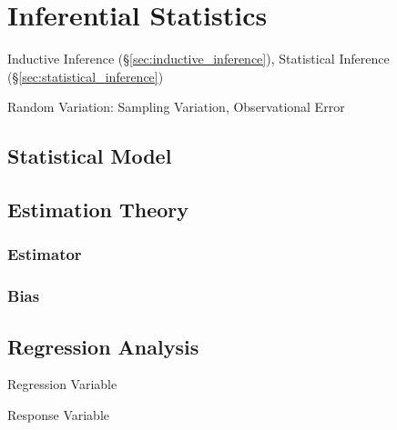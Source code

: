 \section{Inferential Statistics}\label{sec:inferential_statistics}

Inductive Inference (\S\ref{sec:inductive_inference}), Statistical
Inference (\S\ref{sec:statistical_inference})

Random Variation: Sampling Variation, Observational Error



\subsection{Statistical Model}\label{sec:statistical_model}

\subsection{Estimation Theory}\label{sec:estimation_theory}

\subsubsection{Estimator}\label{sec:estimator}

\subsubsection{Bias}\label{sec:bias}



\subsection{Regression Analysis}\label{sec:regression_analysis}

Regression Variable

Response Variable



